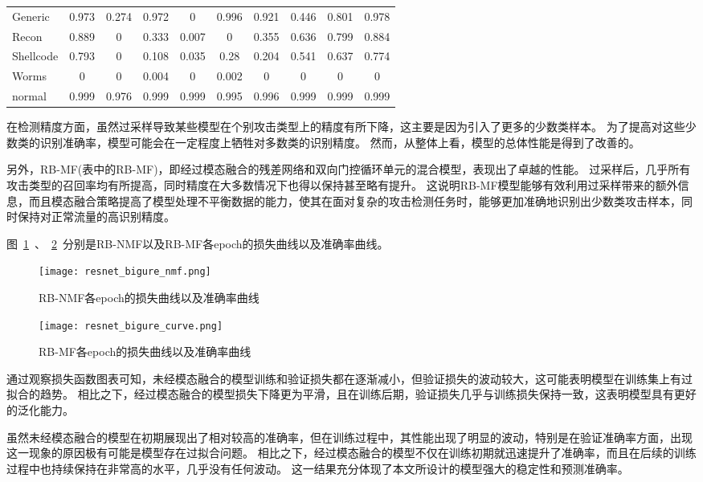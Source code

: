 \begin{table}[htbp]
\begin{tabular}{lccccccccc}
		Generic   & 0.973 & 0.274 & 0.972 & 0     & 0.996 & 0.921 & 0.446 & 0.801  & 0.978 \\
		Recon     & 0.889 & 0     & 0.333 & 0.007 & 0     & 0.355 & 0.636 & 0.799  & 0.884 \\
		Shellcode & 0.793 & 0     & 0.108 & 0.035 & 0.28  & 0.204 & 0.541 & 0.637  & 0.774 \\
		Worms     & 0     & 0     & 0.004 & 0     & 0.002 & 0     & 0     & 0      & 0     \\
		normal    & 0.999 & 0.976 & 0.999 & 0.999 & 0.995 & 0.996 & 0.999 & 0.999  & 0.999 \\
		\bottomrule
	\end{tabular}
\end{table}
在检测精度方面，虽然过采样导致某些模型在个别攻击类型上的精度有所下降，这主要是因为引入了更多的少数类样本。
为了提高对这些少数类的识别准确率，模型可能会在一定程度上牺牲对多数类的识别精度。
然而，从整体上看，模型的总体性能是得到了改善的。\par

另外，RB-MF(表中的RB-MF)，即经过模态融合的残差网络和双向门控循环单元的混合模型，表现出了卓越的性能。
过采样后，几乎所有攻击类型的召回率均有所提高，同时精度在大多数情况下也得以保持甚至略有提升。
这说明RB-MF模型能够有效利用过采样带来的额外信息，而且模态融合策略提高了模型处理不平衡数据的能力，使其在面对复杂的攻击检测任务时，能够更加准确地识别出少数类攻击样本，同时保持对正常流量的高识别精度。\par


图~\ref{fig:ResNet-BiGRU-NoFusion-loss}~、~\ref{fig:ResNet-BiGRU-Fusion-loss}~分别是RB-NMF以及RB-MF各epoch的损失曲线以及准确率曲线。
\begin{figure}[htbp]
	\centering
	\texttt{[image: resnet\_bigure\_nmf.png]}
	\caption{RB-NMF各epoch的损失曲线以及准确率曲线}
	\label{fig:ResNet-BiGRU-NoFusion-loss}
\end{figure}
\begin{figure}[htbp]
	\centering
	\texttt{[image: resnet\_bigure\_curve.png]}
	\caption{RB-MF各epoch的损失曲线以及准确率曲线}
	\label{fig:ResNet-BiGRU-Fusion-loss}
\end{figure}
通过观察损失函数图表可知，未经模态融合的模型训练和验证损失都在逐渐减小，但验证损失的波动较大，这可能表明模型在训练集上有过拟合的趋势。
相比之下，经过模态融合的模型损失下降更为平滑，且在训练后期，验证损失几乎与训练损失保持一致，这表明模型具有更好的泛化能力。\par
虽然未经模态融合的模型在初期展现出了相对较高的准确率，但在训练过程中，其性能出现了明显的波动，特别是在验证准确率方面，出现这一现象的原因极有可能是模型存在过拟合问题。
相比之下，经过模态融合的模型不仅在训练初期就迅速提升了准确率，而且在后续的训练过程中也持续保持在非常高的水平，几乎没有任何波动。
这一结果充分体现了本文所设计的模型强大的稳定性和预测准确率。\par

